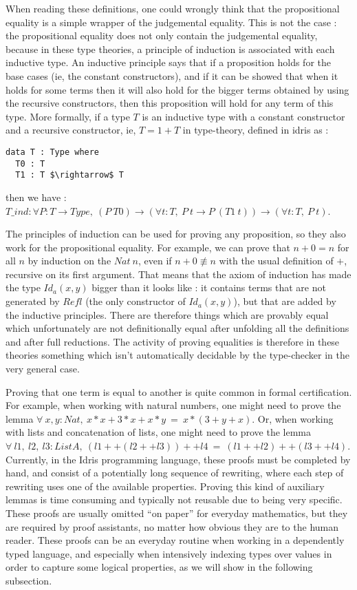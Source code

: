When reading these definitions, one could wrongly think that the propositional equality is a simple wrapper of the judgemental equality. This is not the case : the propositional equality does not only contain the judgemental equality, because in these type theories, a principle of induction is associated with each inductive type. An inductive principle says that if a proposition holds for the base cases (ie, the constant constructors), and if it can be showed that when it holds for some terms then it will also hold for the bigger terms obtained by using the recursive constructors, then this proposition will hold for any term of this type. More formally, if a type $T$ is an inductive type with a constant constructor and a recursive constructor, ie, $T = 1 + T$ in type-theory, defined in idris as : 

\begin{lstlisting}
data T : Type where
  T0 : T
  T1 : T $\rightarrow$ T          
\end{lstlisting}

then we have : \\
$T\_ind : \forall P:T \rightarrow Type,\ (P\ T0) \rightarrow (\forall t:T,\ P\ t \rightarrow P\ (T1\ t)) \rightarrow (\forall t:T,\ P\ t)$.

The principles of induction can be used for proving any proposition, so they also work for the propositional equality. For example, we can prove that $n+0 = n$ for all $n$ by induction on the $Nat\ n$, even if $n+0 \not\equiv n$ with the usual definition of $+$, recursive on its first argument. That means that the axiom of induction has made the type $Id_{a}(x,y)$ bigger than it looks like : it contains terms that are not generated by $Refl$ (the only constructor of $Id_{a}(x,y)$), but that are added by the inductive principles. There are therefore things which are provably equal which unfortunately are not definitionally equal after unfolding all the definitions and after full reductions. The activity of proving equalities is therefore in these theories something which isn't automatically decidable by the type-checker in the very general case.

Proving that one term is equal to another is quite common
in formal certification. For example, when working with natural numbers, one might need to prove the lemma $\forall\ x, y:Nat,\ x*x + 3*x + x*y\ =\ x*(3+y+x)$. Or, when working with lists and concatenation of lists, one might need to prove the lemma $\forall\ l1,\ l2,\ l3:List A,\ (l1 ++ (l2 ++ l3)) ++ l4\ =\ (l1++l2) ++ (l3++l4)$. Currently, in the Idris programming language, these proofs must be completed by hand, and consist of a potentially long sequence of rewriting, where each step of rewriting uses one of the available properties. Proving this kind of auxiliary lemmas is time consuming and typically not reusable due to being very specific. These proofs are usually omitted ``on paper'' for everyday mathematics, but they are required by proof assistants, no matter how obvious they are to the human reader. These proofs can be an everyday routine when working in a dependently typed language, and especially when intensively indexing types over values in order to capture some logical properties, as we will show in the following subsection.

